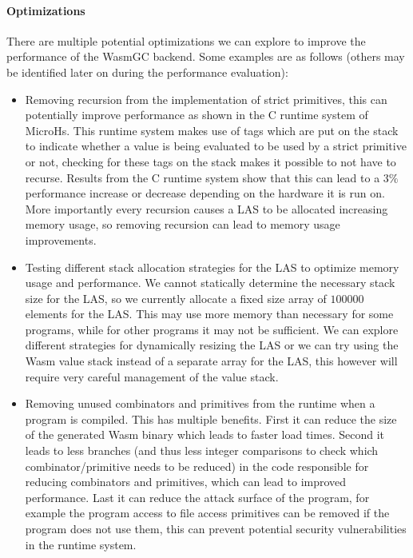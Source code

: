 \paragraph{Optimizations} There are multiple potential optimizations we can explore to improve the performance of the WasmGC backend. Some examples are as follows (others may be identified later on during the performance evaluation):
\begin{itemize}
    \item Removing recursion from the implementation of strict primitives, this can potentially improve performance as shown in the C runtime system of MicroHs. This runtime system makes use of tags which are put on the stack to indicate whether a value is being evaluated to be used by a strict primitive or not, checking for these tags on the stack makes it possible to not have to recurse. Results from the C runtime system show that this can lead to a $3\%$ performance increase or decrease depending on the hardware it is run on. More importantly every recursion causes a LAS to be allocated increasing memory usage, so removing recursion can lead to memory usage improvements.
    \item Testing different stack allocation strategies for the LAS to optimize memory usage and performance. We cannot statically determine the necessary stack size for the LAS, so we currently allocate a fixed size array of $100000$ elements for the LAS. This may use more memory than necessary for some programs, while for other programs it may not be sufficient. We can explore different strategies for dynamically resizing the LAS or we can try using the Wasm value stack instead of a separate array for the LAS, this however will require very careful management of the value stack.
    \item Removing unused combinators and primitives from the runtime when a program is compiled. This has multiple benefits. First it can reduce the size of the generated Wasm binary which leads to faster load times. Second it leads to less branches (and thus less integer comparisons to check which combinator/primitive needs to be reduced) in the code responsible for reducing combinators and primitives, which can lead to improved performance. Last it can reduce the attack surface of the program, for example the program access to file access primitives can be removed if the program does not use them, this can prevent potential security vulnerabilities in the runtime system.
\end{itemize}

